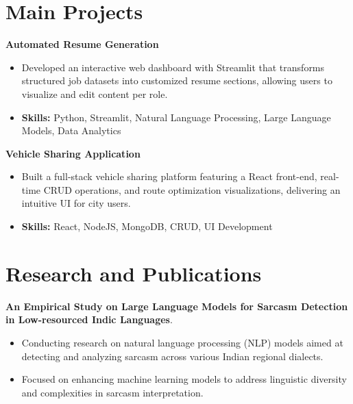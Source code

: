 \documentclass[a4paper,11pt]{article}
\begin{document}
\section{\textbf{Main Projects}}

\vspace{1mm}
  \textbf{Automated Resume Generation  }
\vspace{-1.5mm} %
\begin{itemize}
  \item Developed an interactive web dashboard with Streamlit that transforms structured job datasets into customized resume sections, allowing users to visualize and edit content per role.
\vspace{-3mm}
  \item \textbf{Skills:} Python, Streamlit, Natural Language Processing, Large Language Models, Data Analytics
\end{itemize}


\vspace{1mm}
   \textbf{Vehicle Sharing Application }
\vspace{-1.5mm} %
\begin{itemize}
  \item Built a full-stack vehicle sharing platform featuring a React front-end, real-time CRUD operations, and route optimization visualizations, delivering an intuitive UI for city users.
\vspace{-3mm}
  \item \textbf{Skills:} React, NodeJS, MongoDB, CRUD, UI Development
\end{itemize}



\section{\textbf{Research and Publications} \hfill }
\vspace{1mm}
  \textbf{An Empirical Study on Large Language Models for Sarcasm Detection in Low-resourced Indic Languages}.
\vspace{-1mm} %
\begin{itemize}
  \item Conducting research on natural language processing (NLP) models aimed at detecting and analyzing sarcasm across various Indian regional dialects.
\vspace{-3mm}
  \item Focused on enhancing machine learning models to address linguistic diversity and complexities in sarcasm interpretation.
\end{itemize}
\end{document}
